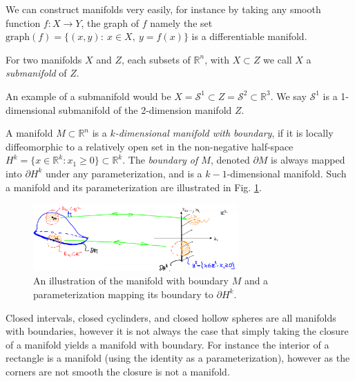 We can construct manifolds very easily, for instance by taking any smooth function $f:X \to Y$, the graph of $f$ namely the set $ \textrm{graph} (f)=\{(x,y):\ x\in X,\ y=f(x)\}$ is a differentiable manifold. 

\begin{definition}
	For two manifolds $X$ and $Z$, each subsets of $\mathbb{R}^{n}$, with $X \subset Z$ we call $X$ a \emph{submanifold} of $Z$. 
\end{definition}
An example of a submanifold would be $X=\mathcal{S}^{1}\subset Z = \mathcal{S}^{2} \subset \mathbb{R}^{3}$. We say $\mathcal{S}^{1}$ is a 1-dimensional submanifold of the 2-dimension manifold $Z$.

\begin{definition}
	A manifold $M\subset \mathbb{R}^{n}$ is a \emph{$k$-dimensional manifold with boundary}, if it is locally diffeomorphic to a relatively open set in the non-negative half-space $H^{k}=\{x\in \mathbb{R}^k: x_1 \geq 0\} \subset \mathbb{R}^{k}$. The \emph{boundary of $M$}, denoted $\partial M$ is always mapped into $\partial H^{k}$ under any parameterization, and is a $k-1$-dimensional manifold. Such a manifold and its parameterization are illustrated in Fig. \ref{fig:bndry_mfd_def}.
	\begin{figure}[h!]
		\centering
		\includegraphics[width=0.7\textwidth]{figures/ch9/5bndry_mfd_def.png}
		\caption{An illustration of the manifold with boundary $M$ and a parameterization mapping its boundary to $\partial H^{k}$.}
		\label{fig:bndry_mfd_def}
	\end{figure}
\end{definition}

Closed intervals, closed cyclinders, and closed hollow spheres are all manifolds with boundaries, however it is not always the case that simply taking the closure of a manifold yields a manifold with boundary. For instance the interior of a rectangle is a manifold (using the identity as a parameterization), however as the corners are not smooth the closure is not a manifold.

